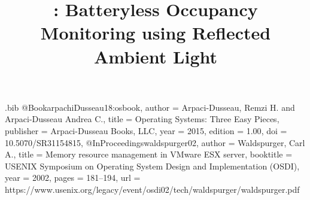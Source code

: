 \usepackage{pifont}%
\newcommand{\cmark}{\ding{51}}%
\newcommand{\xmark}{\ding{55}}%




\begin{filecontents}{\jobname.bib}
@Book{arpachiDusseau18:osbook, 
  author =       {Arpaci-Dusseau, Remzi H. and Arpaci-Dusseau Andrea C.}, 
  title =        {Operating Systems: Three Easy Pieces}, 
  publisher =    {Arpaci-Dusseau Books, LLC}, 
  year =         2015,
  edition =      {1.00}, 
  doi = 	{10.5070/SR31154815},}
@InProceedings{waldspurger02, 
  author =       {Waldspurger, Carl A.}, 
  title =  	{Memory resource management in {VMware ESX} server}, 
  booktitle =    {USENIX Symposium on Operating System Design and Implementation (OSDI)}, 
  year =   	2002, 
  pages =        {181--194}, 
  url =	{https://www.usenix.org/legacy/event/osdi02/tech/waldspurger/waldspurger.pdf}}
\end{filecontents}



\usepackage{orcidlink}


\date{}

\title{\sysname: Batteryless Occupancy Monitoring using Reflected Ambient Light}

